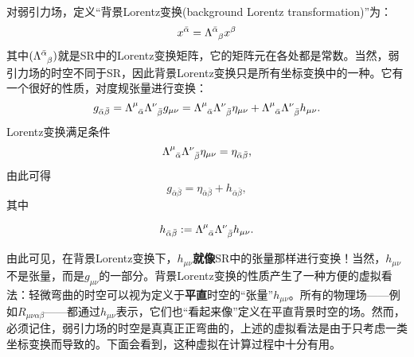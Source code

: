 对弱引力场，定义“背景Lorentz变换(background Lorentz transformation)”为：
\begin{equation}
    x^{\bar{\alpha}} = \Lambda\indices{^{\bar{\alpha}}_\beta} x^\beta
\label{equ8.15}
\end{equation}
其中$(\Lambda\indices{^{\bar{\alpha}}_\beta})$就是SR中的Lorentz变换矩阵，它的矩阵元在各处都是常数。当然，弱引力场的时空不同于SR，因此背景Lorentz变换只是所有坐标变换中的一种。它有一个很好的性质，对度规张量进行变换：
\begin{equation}
    g_{\bar{\alpha} \bar{\beta}} = \Lambda\indices{^\mu_{\bar{\alpha}}} \Lambda\indices{^\nu_{\bar{\beta}}} g_{\mu \nu} = \Lambda\indices{^\mu_{\bar{\alpha}}} \Lambda\indices{^\nu_{\bar{\beta}}} \eta_{\mu \nu} + \Lambda\indices{^\mu_{\bar{\alpha}}} \Lambda\indices{^\nu_{\bar{\beta}}} h_{\mu \nu}.
\label{equ8.16}
\end{equation}
Lorentz变换满足条件
\begin{equation}
    \Lambda\indices{^\mu_{\bar{\alpha}}} \Lambda\indices{^\nu_{\bar{\beta}}} \eta_{\mu \nu} = \eta_{\bar{\alpha} \bar{\beta}},
\label{equ8.17}
\end{equation}
由此可得
\begin{equation}
    g_{\bar{\alpha} \bar{\beta}} = \eta_{\bar{\alpha} \bar{\beta}} + h_{\bar{\alpha} \bar{\beta}},
\label{equ8.18}
\end{equation}
其中
\begin{shaded}
\begin{equation}
    h_{\bar{\alpha} \bar{\beta}} :=  \Lambda\indices{^\mu_{\bar{\alpha}}} \Lambda\indices{^\nu_{\bar{\beta}}} h_{\mu \nu}.
\label{equ8.19}
\end{equation}
\end{shaded}
由此可见，在背景Lorentz变换下，$h_{\mu \nu}$\textbf{就像}SR中的张量那样进行变换！当然，$h_{\mu \nu}$不是张量，而是$g_{\mu \nu}$的一部分。背景Lorentz变换的性质产生了一种方便的虚拟看法：轻微弯曲的时空可以视为定义于\textbf{平直}时空的“张量”$h_{\mu \nu}$。所有的物理场——例如$R_{\mu \nu \alpha \beta}$——都通过$h_{\mu \nu}$表示，它们也“看起来像”定义在平直背景时空的场。然而，必须记住，弱引力场的时空是真真正正弯曲的，上述的虚拟看法是由于只考虑一类坐标变换而导致的。下面会看到，这种虚拟在计算过程中十分有用。

